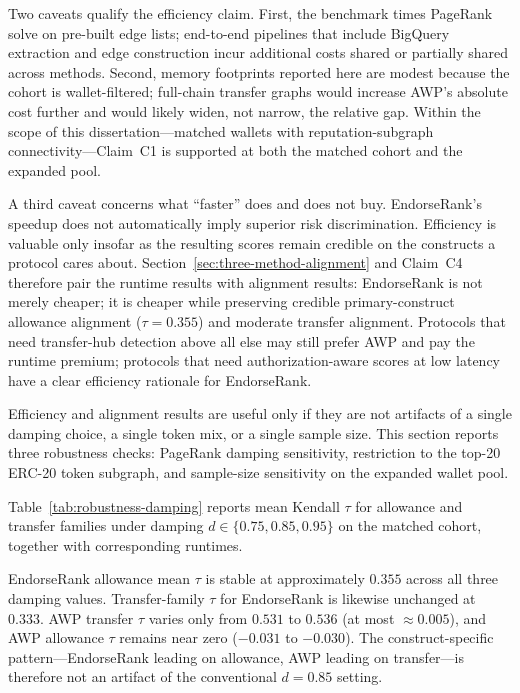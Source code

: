 Two caveats qualify the efficiency claim. First, the benchmark times PageRank solve on pre-built edge lists; end-to-end pipelines that include BigQuery extraction and edge construction incur additional costs shared or partially shared across methods. Second, memory footprints reported here are modest because the cohort is wallet-filtered; full-chain transfer graphs would increase AWP's absolute cost further and would likely widen, not narrow, the relative gap. Within the scope of this dissertation---matched wallets with reputation-subgraph connectivity---Claim~C1 is supported at both the matched cohort and the expanded pool.

A third caveat concerns what ``faster'' does and does not buy. EndorseRank's speedup does not automatically imply superior risk discrimination. Efficiency is valuable only insofar as the resulting scores remain credible on the constructs a protocol cares about. Section~\ref{sec:three-method-alignment} and Claim~C4 therefore pair the runtime results with alignment results: EndorseRank is not merely cheaper; it is cheaper while preserving credible primary-construct allowance alignment ($\tau=0.355$) and moderate transfer alignment. Protocols that need transfer-hub detection above all else may still prefer AWP and pay the runtime premium; protocols that need authorization-aware scores at low latency have a clear efficiency rationale for EndorseRank.


Efficiency and alignment results are useful only if they are not artifacts of a single damping choice, a single token mix, or a single sample size. This section reports three robustness checks: PageRank damping sensitivity, restriction to the top-20 ERC-20 token subgraph, and sample-size sensitivity on the expanded wallet pool.


Table~\ref{tab:robustness-damping} reports mean Kendall $\tau$ for allowance and transfer families under damping $d \in \{0.75, 0.85, 0.95\}$ on the matched cohort, together with corresponding runtimes.



EndorseRank allowance mean $\tau$ is stable at approximately $0.355$ across all three damping values. Transfer-family $\tau$ for EndorseRank is likewise unchanged at $0.333$. AWP transfer $\tau$ varies only from $0.531$ to $0.536$ (at most $\approx 0.005$), and AWP allowance $\tau$ remains near zero ($-0.031$ to $-0.030$). The construct-specific pattern---EndorseRank leading on allowance, AWP leading on transfer---is therefore not an artifact of the conventional $d=0.85$ setting.


